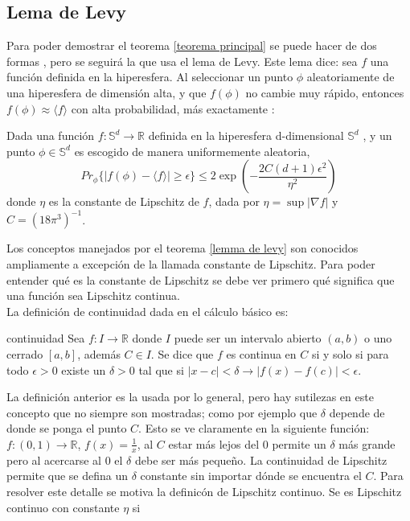 \subsection{Lema de Levy} \label{ levy}
Para poder demostrar el teorema \ref{teorema principal} se puede hacer de dos formas \cite{Popescu2006}, pero se seguirá la que usa el lema de Levy. Este lema dice: sea $f$ una función definida en la hiperesfera. Al seleccionar un punto $\phi$ aleatoriamente de una hiperesfera de dimensión alta, y que $f(\phi)$ no cambie muy rápido, entonces $f(\phi) \approx \langle f \rangle $ con alta probabilidad, más exactamente  \cite{Lema}:
\\
\begin{lemma} \label{lemma de levy}

Dada una función $f: \mathbb{S}^d \to \mathbb{R} $ definida en la hiperesfera d-dimensional $\mathbb{S}^d$ , y un punto $\phi \in \mathbb{S}^d $ es escogido de manera uniformemente aleatoria,
\begin{equation}
Pr_{\phi} \{ |f(\phi)- \langle f \rangle| \geq \epsilon \} \leq 2 \exp(-\frac{2C(d+1)\epsilon^2}{\eta^2})
\end{equation}
donde $\eta$ es la constante de Lipschitz de $f$, dada por $\eta= \sup|\nabla f|$ y $C=(18 \pi^3)^{-1} $.\\

\end{lemma}

Los conceptos manejados por el teorema \ref{lemma de levy} son conocidos ampliamente a excepción de la llamada constante de Lipschitz. Para poder entender qué es la  constante de Lipschitz se debe ver primero qué significa que una función sea Lipschitz continua. 
\\
La definición de continuidad dada en el cálculo básico es:

\theoremstyle{definition}
\begin{definition}{continuidad}
Sea $f: I \to \mathbb{R}$ donde $I$ puede ser un intervalo abierto $(a,b)$ o uno cerrado $[a,b]$, además $C \in I$. Se dice que $f$ es continua en $C$ si y solo si para todo $ \epsilon >0 $  existe un $ \delta >0 $ tal que si $ |x-c| < \delta \longrightarrow |f(x)-f(c)|< \epsilon $.
\end{definition} 

La  definición anterior es la usada por lo general, pero hay sutilezas en este concepto que no siempre son mostradas; como por ejemplo que $\delta$ depende de donde se ponga el punto $C$. Esto se ve claramente en la siguiente función: $f: (0,1) \to \mathbb{R}$, $f(x)=\frac{1}{x} $, al $C$ estar más lejos del $0$ permite un $\delta$ más grande pero al acercarse al $0$ el $\delta$ debe ser más pequeño. La continuidad de Lipschitz permite que se defina un $\delta$ constante sin importar dónde se encuentra el $C$. Para resolver este detalle se motiva la definicón de Lipschitz continuo. Se es Lipschitz continuo con constante $\eta$ si

